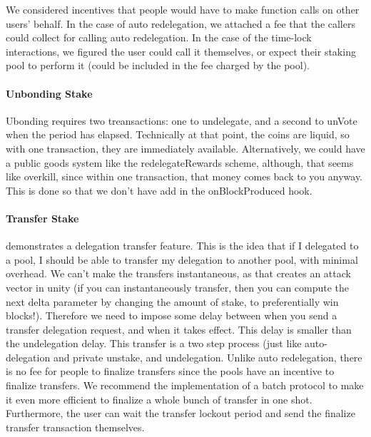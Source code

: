 We considered incentives that people would have to make function calls on other users' behalf. In the case of auto redelegation, we attached a fee that the callers could collect for calling auto redelegation. In the case of the time-lock interactions, we figured the user could call it themselves, or expect their staking pool to perform it (could be included in the fee charged by the pool). 

\paragraph{Unbonding Stake}
Ubonding requires two treansactions: one to undelegate, and a second to unVote when the period has elapsed. Technically at that point, the coins are liquid, so with one transaction, they are immediately available. Alternatively, we could have a public goods system like the redelegateRewards scheme, although, that seems like overkill, since within one transaction, that money comes back to you anyway. This is done so that we don't have add in the onBlockProduced hook. 

\paragraph{Transfer Stake} demonstrates a delegation transfer feature. This is the idea that if I delegated to a pool, I should be able to transfer my delegation to another pool, with minimal overhead. We can't make the transfers instantaneous, as that creates an attack vector in unity (if you can instantaneously transfer, then you can compute the next delta parameter by changing the amount of stake, to preferentially win blocks!). Therefore we need to impose some delay between when you send a transfer delegation request, and when it takes effect. This delay is smaller than the undelegation delay. This transfer is a two step process (just like auto-delegation and private unstake, and undelegation. Unlike auto redelegation, there is no fee for people to finalize transfers since the pools have an incentive to finalize transfers. We recommend the implementation of a batch protocol to make it even more efficient to finalize a whole bunch of transfer in one shot. Furthermore, the user can wait the transfer lockout period and send the finalize transfer transaction themselves. 

